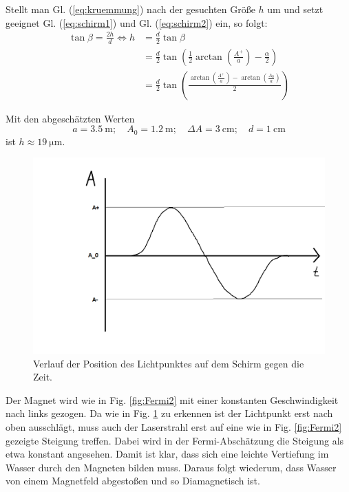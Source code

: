 \documentclass[11pt,a4paper,titlepage, ngerman]{article}
\newcommand{\refeq}[1]{Gl. (\ref{eq:#1})}
\newcommand{\reffig}[1]{Fig. \ref{fig:#1}}
\begin{document}
	Stellt man \refeq{kruemmung} nach der gesuchten Größe $h$ um und setzt geeignet \refeq{schirm1} und \refeq{schirm2} ein, so folgt:
	\begin{align}
		\tan \beta = \frac{2h}{d} \Leftrightarrow h &= \frac{d}{2} \tan \beta\\
		&= \frac{d}{2} \tan \left( \frac{1}{2}\arctan \left( \frac{A^+}{a}\right) - \frac{\alpha}{2}\right)\\
		&= \frac{d}{2} \tan \left( \frac{\arctan \left( \frac{A^+}{a}\right) - \arctan\left( \frac{A_0}{a}\right)}{2} \right)
	\end{align}
	
	Mit den abgeschätzten Werten
	\begin{equation}
		a = \SI{3,5}{\meter};\quad
		A_0 = \SI{1,2}{\meter};\quad
		\Delta A = \SI{3}{\centi\meter};\quad
		d = \SI{1}{\centi\meter}
	\end{equation}
	ist $h \approx \SI{19}{\micro\meter}$.
	
	\begin{figure}[ht]
		\includegraphics[width=\textwidth]{SkizzeZeitverlaufLichtpunktWasser.png}
		\caption{Verlauf der Position des Lichtpunktes auf dem Schirm gegen die Zeit.}
		\label{fig:zeitverlauf}
	\end{figure}
	
	Der Magnet wird wie in \reffig{Fermi2} mit einer konstanten Geschwindigkeit nach links gezogen.
	Da wie in \reffig{zeitverlauf} zu erkennen ist der Lichtpunkt erst nach oben ausschlägt, muss auch der Laserstrahl erst auf eine wie in \reffig{Fermi2} gezeigte Steigung treffen.
	Dabei wird in der Fermi-Abschätzung die Steigung als etwa konstant angesehen.
	Damit ist klar, dass sich eine leichte Vertiefung im Wasser durch den Magneten bilden muss.
	Daraus folgt wiederum, dass Wasser von einem Magnetfeld abgestoßen und so Diamagnetisch ist.
	
\end{document}

